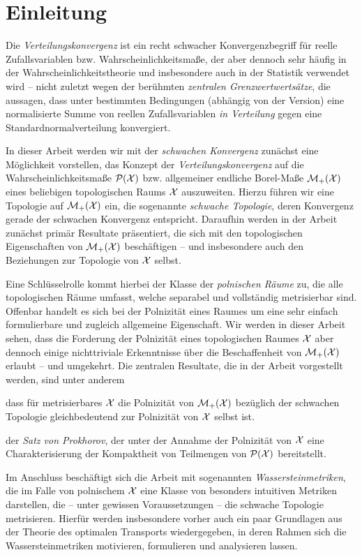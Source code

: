 \documentclass[../thesis/thesis.tex]{subfiles}
\begin{document}
	
	\chapter{Einleitung}
	
	Die \emph{Verteilungskonvergenz} ist ein recht schwacher Konvergenzbegriff für reelle Zufallsvariablen bzw. Wahrscheinlichkeitsmaße, der
	aber dennoch sehr häufig in der Wahrscheinlichkeitstheorie und insbesondere auch in der Statistik verwendet wird -- nicht zuletzt
	wegen der berühmten \emph{zentralen Grenzwertwertsätze}, die aussagen, dass unter bestimmten Bedingungen (abhängig von der Version)
	eine normalisierte Summe von reellen Zufallsvariablen \emph{in Verteilung} gegen eine Standardnormalverteilung konvergiert.
	
	In dieser Arbeit werden wir mit der \emph{schwachen Konvergenz} zunächst eine Möglichkeit vorstellen, das Konzept der \emph{Verteilungskonvergenz} 
	auf die Wahrscheinlichkeitsmaße $\mathcal{P}(\mathcal{X})$ bzw. allgemeiner endliche Borel-Maße $\mathcal{M}_{+}(\mathcal{X})$ eines 
	beliebigen topologischen Raums $\mathcal{X}$ auszuweiten. Hierzu führen wir eine Topologie
	auf $\mathcal{M}_{+}(\mathcal{X})$ ein, die sogenannte \emph{schwache Topologie}, deren Konvergenz gerade der schwachen Konvergenz entspricht.
	Daraufhin werden in der Arbeit zunächst primär Resultate präsentiert, die sich mit den topologischen Eigenschaften 
	von $\mathcal{M}_{+}(\mathcal{X})$ beschäftigen -- und insbesondere auch den Beziehungen zur Topologie von $\mathcal{X}$ selbst.
	
	Eine Schlüsselrolle kommt hierbei der Klasse der \emph{polnischen Räume} zu, die alle topologischen Räume umfasst, welche separabel und vollständig 
	metrisierbar sind. Offenbar handelt es sich bei der Polnizität eines Raumes um eine sehr einfach formulierbare und zugleich allgemeine Eigenschaft. 
	Wir werden in dieser Arbeit sehen, dass die Forderung der Polnizität 
	eines topologischen Raumes $\mathcal{X}$ aber dennoch einige nichttriviale Erkenntnisse über die Beschaffenheit von $\mathcal{M}_{+}(\mathcal{X})$ erlaubt -- und umgekehrt.
	Die zentralen Resultate, die in der Arbeit vorgestellt werden, sind unter anderem
	\begin{itemizethm}
		\item dass für metrisierbares $\mathcal{X}$ die Polnizität von $\mathcal{M}_{+}(\mathcal{X})$ bezüglich der schwachen Topologie
		gleichbedeutend zur Polnizität von $\mathcal{X}$ selbst ist.
		\item der \emph{Satz von Prokhorov}, der unter der Annahme der Polnizität von $\mathcal{X}$ eine Charakterisierung der Kompaktheit 
		von Teilmengen von $\mathcal{P}(\mathcal{X})$ bereitstellt.
	\end{itemizethm}
	Im Anschluss beschäftigt sich die Arbeit mit sogenannten \emph{Wassersteinmetriken}, die im Falle von polnischem $\mathcal{X}$ eine Klasse von 
	besonders intuitiven Metriken darstellen, die -- unter gewissen Voraussetzungen -- die schwache Topologie metrisieren. 
	Hierfür werden insbesondere vorher auch ein paar Grundlagen aus der Theorie des optimalen Transports wiedergegeben, in deren Rahmen sich 
	die Wassersteinmetriken motivieren, formulieren und analysieren lassen.
	
\end{document}
